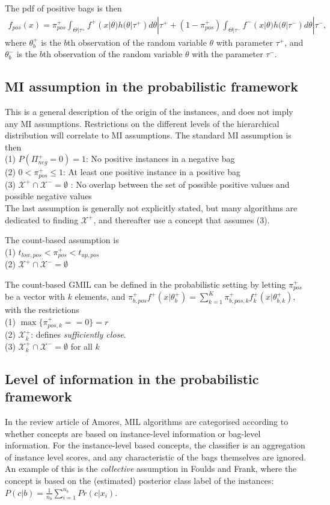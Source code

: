 The pdf of positive bags is then
\begin{align*}
  f_{pos}(x) = \pi_{pos}^+ \int_{\Theta|\tau^+} f^+(x|\theta)h(\theta|\tau^+) d\theta|\tau^+  +(1-\pi_{pos}^+) \int_{\Theta|\tau^-} f^-(x|\theta) h(\theta|\tau^-) d\theta|\tau^-, 
\end{align*}
where $\theta^+_b$ is the $b$th observation of the random variable $\theta$ with parameter $\tau^+$, and $\theta_b^-$ is the $b$th observation of the random variable $\theta$ with the parameter $\tau^-$.


\subsection{MI assumption in the probabilistic framework}
This is a general description of the origin of the instances, and does not imply any MI assumptions. 
Restrictions on the different levels of the hierarchical distribution will correlate to MI assumptions.
The standard MI assumption is then \\
(1) $P(\Pi^+_{neg} = 0) = 1$: No positive instances in a negative bag\\
(2) $0<\pi^+_{pos} \leq 1$: At least one positive instance in a positive bag\\
(3) $\mathcal{X}^+ \cap \mathcal{X}^- = \emptyset$ : No overlap between the set of possible positive values and possible negative values \\
The last assumption is generally not explicitly stated, but many algorithms are dedicated to finding $\mathcal{X}^+$, and thereafter use a concept that assumes (3). 

The count-based assumption is\\
(1) $t_{low,pos} < \pi^+_{pos} < t_{up,pos}$ \\
(2) $\mathcal{X}^+ \cap \mathcal{X}^- = \emptyset$ 

The count-based GMIL can be defined in the probabilistic setting by letting $\pi^+_{pos}$ be a vector with $k$ elements, and $\pi^+_{b,pos} f^+(x|\theta_b^+) = \sum_{k = 1}^K \pi^+_{b,pos,k} f^+_k(x|\theta_{b,k}^+)$, with the restrictions\\
(1) $\max \{\pi^+_{pos,k} == 0\} = r$ \\
(2) $\mathcal{X}^+_k$: defines {\it sufficiently close}. \\
(3) $\mathcal{X}^+_k \cap \mathcal{X}^- = \emptyset$ for all $k$ 

\subsection{Level of information in the probabilistic framework}
In the review article of Amores, MIL algorithms are categorised according to whether concepts are based on instance-level information or bag-level information. 
For the instance-level based concepts, the classifier is an aggregation of instance level scores, and any characteristic of the bags themselves are ignored. 
An example of this is the {\it collective} assumption in Foulds and Frank, where the concept is based on the (estimated) posterior class label of the instances: $P(c|b) = \frac{1}{n_b} \sum_{i = 1}^{n_b} Pr(c|x_i)$. 

